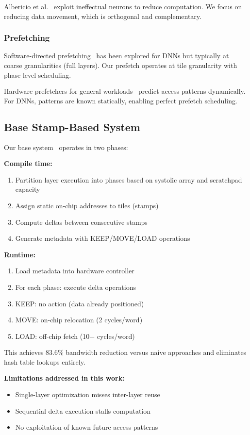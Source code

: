 \documentclass[journal]{IEEEtran}
\begin{document}
Albericio et al.~\cite{albericio2016cnvlutin} exploit ineffectual neurons to reduce computation. We focus on reducing data movement, which is orthogonal and complementary.

\subsubsection{Prefetching}
Software-directed prefetching~\cite{chen2016eyeriss} has been explored for DNNs but typically at coarse granularities (full layers). Our prefetch operates at tile granularity with phase-level scheduling.

Hardware prefetchers for general workloads~\cite{palacharla1994} predict access patterns dynamically. For DNNs, patterns are known statically, enabling perfect prefetch scheduling.

\subsection{Base Stamp-Based System}

Our base system~\cite{stampconf2026} operates in two phases:

\textbf{Compile time:}
\begin{enumerate}
\item Partition layer execution into phases based on systolic array and scratchpad capacity
\item Assign static on-chip addresses to tiles (stamps)
\item Compute deltas between consecutive stamps
\item Generate metadata with KEEP/MOVE/LOAD operations
\end{enumerate}

\textbf{Runtime:}
\begin{enumerate}
\item Load metadata into hardware controller
\item For each phase: execute delta operations
\item KEEP: no action (data already positioned)
\item MOVE: on-chip relocation (2 cycles/word)
\item LOAD: off-chip fetch (10+ cycles/word)
\end{enumerate}

This achieves 83.6\% bandwidth reduction versus naive approaches and eliminates hash table lookups entirely.

\textbf{Limitations addressed in this work:}
\begin{itemize}
\item Single-layer optimization misses inter-layer reuse
\item Sequential delta execution stalls computation
\item No exploitation of known future access patterns
\end{itemize}
\end{document}

